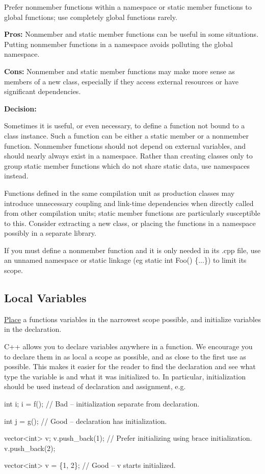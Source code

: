 Prefer nonmember functions within a namespace or static member functions to global functions; use completely global functions rarely.

{\bfseries Pros\+:} Nonmember and static member functions can be useful in some situations. Putting nonmember functions in a namespace avoids polluting the global namespace.

{\bfseries Cons\+:} Nonmember and static member functions may make more sense as members of a new class, especially if they access external resources or have significant dependencies.

{\bfseries Decision\+:}

Sometimes it is useful, or even necessary, to define a function not bound to a class instance. Such a function can be either a static member or a nonmember function. Nonmember functions should not depend on external variables, and should nearly always exist in a namespace. Rather than creating classes only to group static member functions which do not share static data, use namespaces instead.

Functions defined in the same compilation unit as production classes may introduce unnecessary coupling and link-\/time dependencies when directly called from other compilation units; static member functions are particularly susceptible to this. Consider extracting a new class, or placing the functions in a namespace possibly in a separate library.

If you must define a nonmember function and it is only needed in its .cpp file, use an unnamed namespace or static linkage (eg static int Foo() \{...\}) to limit its scope.

\subsection*{Local Variables}

\hyperlink{classPlace}{Place} a function\textquotesingle{}s variables in the narrowest scope possible, and initialize variables in the declaration.

C++ allows you to declare variables anywhere in a function. We encourage you to declare them in as local a scope as possible, and as close to the first use as possible. This makes it easier for the reader to find the declaration and see what type the variable is and what it was initialized to. In particular, initialization should be used instead of declaration and assignment, e.\+g.


\begin{DoxyCode}
\textcolor{keywordtype}{int} i;
i = f();      \textcolor{comment}{// Bad -- initialization separate from declaration.}

\textcolor{keywordtype}{int} j = g();  \textcolor{comment}{// Good -- declaration has initialization.}

vector<int> v;
v.push\_back(1);  \textcolor{comment}{// Prefer initializing using brace initialization.}
v.push\_back(2);

vector<int> v = \{1, 2\};  \textcolor{comment}{// Good -- v starts initialized.}
\end{DoxyCode}


